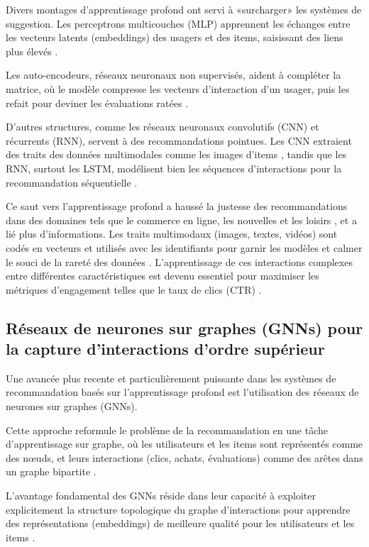 Divers montages d'apprentissage profond ont servi à «surcharger» les systèmes de suggestion. Les perceptrons multicouches (MLP) apprennent les échanges entre les vecteurs latents (embeddings) des usagers et des items, saisissant des liens plus élevés \citet{He2017}.

Les auto-encodeurs, réseaux neuronaux non supervisés, aident à compléter la matrice, où le modèle compresse les vecteurs d'interaction d'un usager, puis les refait pour deviner les évaluations ratées \citep{Sedhain2018Autorec}.

D'autres structures, comme les réseaux neuronaux convolutifs (CNN) et récurrents (RNN), servent à des recommandations pointues. Les CNN extraient des traits des données multimodales comme les images d'items \citep{Wang2022Sessionbased}, tandis que les RNN, surtout les LSTM, modélisent bien les séquences d'interactions pour la recommandation séquentielle \citep{Hidasi2016Sessionbased}. 

Ce saut vers l'apprentissage profond a haussé la justesse des recommandations dans des domaines tels que le commerce en ligne, les nouvelles et les loisirs \citep{Covington2016, Okura2017Embeddingbased}, et a lié plus d'informations. Les traits multimodaux (images, textes, vidéos) sont codés en vecteurs et utilisés avec les identifiants pour garnir les modèles et calmer le souci de la rareté des données \citep{Zhang2022A, Elkahky2015}. L'apprentissage de ces interactions complexes entre différentes caractéristiques est devenu essentiel pour maximiser les métriques d'engagement telles que le taux de clics (CTR) \citep{Guo2017}.
\subsection{Réseaux de neurones sur graphes (GNNs) pour la capture d'interactions d'ordre supérieur}

Une avancée plus recente et particulièrement puissante dans les systèmes de recommandation basés sur l'apprentissage profond est l'utilisation des réseaux de neurones sur graphes (GNNs).

Cette approche reformule le problème de la recommandation en une tâche d'apprentissage sur graphe, où les utilisateurs et les items sont représentés comme des nœuds, et leurs interactions (clics, achats, évaluations) comme des arêtes dans un graphe bipartite \citep{Ying2018, Wang2019}. 

L'avantage fondamental des GNNs réside dans leur capacité à exploiter explicitement la structure topologique du graphe d'interactions pour apprendre des représentations (embeddings) de meilleure qualité pour les utilisateurs et les items \citep{Wu2023Graph}.

